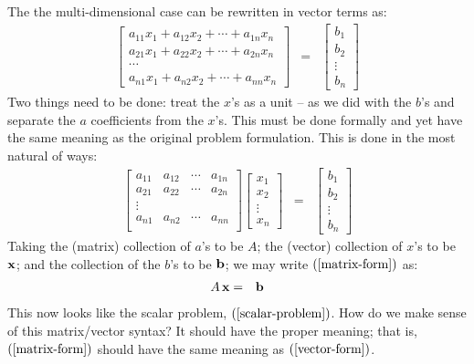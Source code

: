 \documentclass{article}
\begin{document}
The the multi-dimensional case can be rewritten in vector terms as:
\begin{eqnarray}
  \left[
  \begin{array}{c}
  a_{11} x_1 + a_{12} x_2 + \cdots + a_{1n} x_n \\
  a_{21} x_1 + a_{22} x_2 + \cdots + a_{2n} x_n \\
  \cdots  \\
    a_{n1} x_1 + a_{n2} x_2 + \cdots + a_{nn} x_n
  \end{array}
  \right] & = & \left[
                 \begin{array}{c}
                   b_1 \\
                   b_2 \\
                   \vdots \\
                   b_n
                 \end{array}
   \right] \label{vector-form}
\end{eqnarray}
Two things need to be done: treat the $x$'s as a unit -- as we did with the
$b$'s and separate the $a$ coefficients from the $x$'s. This must be done formally
and yet have the same meaning as the original problem formulation.
This is done in the most natural of ways:
\begin{eqnarray}
  \left[
  \begin{array}{cccc}
    a_{11} & a_{12} & \cdots & a_{1n} \\
    a_{21} & a_{22} & \cdots & a_{2n} \\
    \vdots \\
    a_{n1} & a_{n2} & \cdots & a_{nn} \\
    \end{array}
  \right]
  \left[
  \begin{array}{c}
    x_1 \\
    x_2 \\
    \vdots \\
    x_n
  \end{array}
  \right] & = &
                \left[
                \begin{array}{c}
                  b_1 \\
                  b_2 \\
                  \vdots \\
                  b_n
                \end{array}
  \right] \label{matrix-form}
\end{eqnarray}
Taking the (matrix) collection of $a$'s to be $A$; the (vector) collection
of $x$'s to be ${\bf x}$; and the collection of the $b$'s to be ${\bf b}$;
we may write $(\ref{matrix-form})$ as:
\begin{eqnarray}
  A \, {\bf x} & = & {\bf b} \label{concise-matrix-form}
\end{eqnarray}
This now looks like the scalar problem, $(\ref{scalar-problem})$.
How do we make sense of this matrix/vector syntax? It should have
the proper meaning; that is, $(\ref{matrix-form})$
should have the same meaning as $(\ref{vector-form})$.
\end{document}
